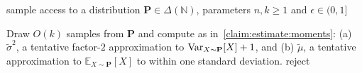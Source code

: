 \documentclass[11pt]{article}
\theoremstyle{definition}
\newcommand{\N}{\mathbb{N}}
\newcommand{\E}{\mathbb{E}}
\newcommand{\p}{\mathbf{P}}
\newcommand{\eps}{\epsilon}
\newcommand{\norm}[1]{\lVert#1\rVert}
\newcommand{\Var}{\mathop{\textnormal{Var}}\nolimits}
\newcommand{\distribs}[1]{\Delta\!\left(#1\right)} \newcommand{\normone}[1]{{\norm{#1}}_1}
\newcommand{\reject}{\textsf{reject}\xspace}
\begin{document}
\begin{algorithm}[ht]
  \begin{algorithmic}[1]
    \Require sample access to a distribution $\p\in\distribs{\N}$, parameters $n,k\geq 1$ and $\eps\in(0,1]$
    
    \State{}
    
    \State\label{algo:step:estimates:mu:sigma} Draw $O(k)$ samples from $\p$ and compute as in~\cref{claim:estimate:moments}: (a) $\widetilde{\sigma}^2$, a tentative factor-$2$ approximation to $\Var_{X \sim \p}[X]+1$,
and (b) $\widetilde{\mu}$, a tentative approximation to $\E_{X \sim \p}[X]$ to within one standard deviation.
     \label{algo:step:check:stdev}
        \State \Return \reject    {}
    \EndIf
    

\end{algorithmic}
\end{algorithm}
\end{document}

